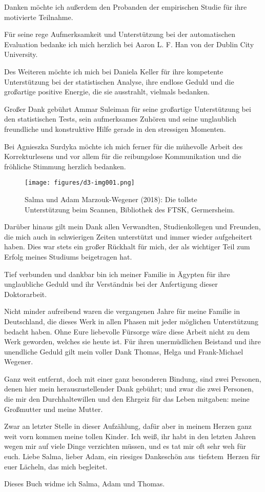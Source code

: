 Danken möchte ich außerdem den Probanden der empirischen Studie für ihre motivierte Teilnahme.

Für seine rege Aufmerksamkeit und Unterstützung bei der automatischen Evaluation bedanke ich mich herzlich bei Aaron L. F. Han von der Dublin City University.

Des Weiteren möchte ich mich bei Daniela Keller für ihre kompetente Unterstützung bei der statistischen Analyse, ihre endlose Geduld und die großartige positive Energie, die sie ausstrahlt, vielmals bedanken.

Großer Dank gebührt Ammar Suleiman für seine großartige Unterstützung bei den statistischen Tests, sein aufmerksames Zuhören und seine unglaublich freundliche und konstruktive Hilfe gerade in den stressigen Momenten.

Bei Agnieszka Surdyka möchte ich mich ferner für die mühevolle Arbeit des Korrekturlesens und vor allem für die reibungslose Kommunikation und die fröhliche Stimmung herzlich bedanken.


\begin{figure}[t]
\texttt{[image: figures/d3-img001.png]}

\caption*{Salma und Adam Marzouk-Wegener (2018): Die tollste Unterstützung beim Scannen, Bibliothek des FTSK, Germersheim.}
\end{figure}

Darüber hinaus gilt mein Dank allen Verwandten, Studienkollegen und Freunden, die mich auch in schwierigen Zeiten unterstützt und immer wieder aufgeheitert haben. Dies war stets ein großer Rückhalt für mich, der als wichtiger Teil zum Erfolg meines Studiums beigetragen hat.

Tief verbunden und dankbar bin ich meiner Familie in Ägypten für ihre unglaubliche Geduld und ihr Verständnis bei der Anfertigung dieser Doktorarbeit.

Nicht minder aufreibend waren die vergangenen Jahre für meine Familie in Deutschland, die dieses Werk in allen Phasen mit jeder möglichen Unterstützung bedacht haben. Ohne Eure liebevolle Fürsorge wäre diese Arbeit nicht zu dem Werk geworden, welches sie heute ist. Für ihren unermüdlichen Beistand und ihre unendliche Geduld gilt mein voller Dank Thomas, Helga und Frank-Michael Wegener.

Ganz weit entfernt, doch mit einer ganz besonderen Bindung, sind zwei Personen, denen hier mein herauszustellender Dank gebührt; und zwar die zwei Personen, die mir den Durchhaltewillen und den Ehrgeiz für das Leben mitgaben: meine Großmutter und meine Mutter.

Zwar an letzter Stelle in dieser Aufzählung, dafür aber in meinem Herzen ganz weit vorn kommen meine tollen Kinder. Ich weiß, ihr habt in den letzten Jahren wegen mir auf viele Dinge verzichten müssen, und es tat mir oft sehr weh für euch. Liebe Salma, lieber Adam, ein riesiges Dankeschön aus~tiefstem~Herzen für euer Lächeln, das mich begleitet.

Dieses Buch widme ich Salma, Adam und Thomas.
